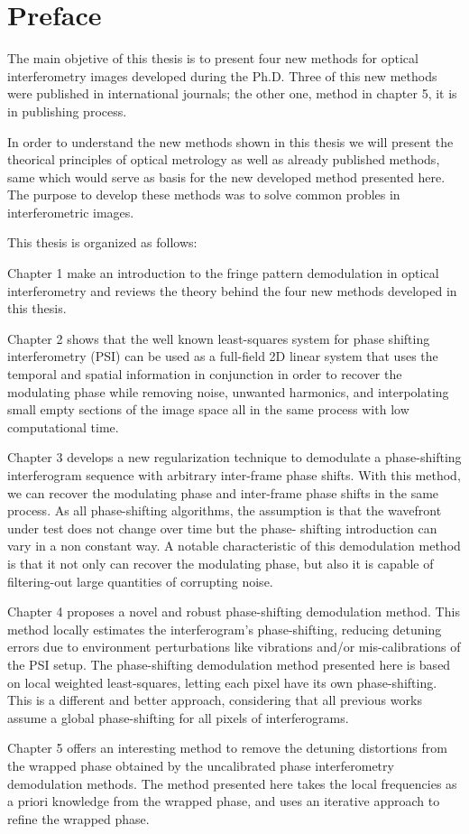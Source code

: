 \chapter*{Preface}

The main objetive of this thesis is to present four new methods for optical 
interferometry images developed during the Ph.D. Three of this new methods were 
published in international journals; the other one, method in chapter 5, it is in
publishing process.

In order to understand the new methods shown in this thesis we will present the
theorical principles of optical metrology as well as already published methods, 
same which would serve as basis for the new developed method presented here. 
The purpose to develop these methods was to solve common probles in interferometric
images. 

This thesis is organized as follows:

Chapter 1 make an introduction to the fringe pattern demodulation in optical 
interferometry and reviews the theory behind the four new methods developed in 
this thesis.

Chapter 2 shows that the well known least-squares system for phase shifting 
interferometry (PSI) can be used as a full-field 2D linear system that uses the 
temporal and spatial information in conjunction in order to recover the modulating 
phase while removing noise, unwanted harmonics, and interpolating small empty
sections of the image space all in the same process with low computational time.

Chapter 3 develops a new regularization technique to demodulate a 
phase-shifting interferogram sequence with arbitrary inter-frame phase shifts. 
With this method, we can recover the modulating phase and inter-frame phase
shifts in the same process. As all phase-shifting algorithms, the assumption
is that the wavefront under test does not change over time but the phase-
shifting introduction can vary in a non constant way. A notable characteristic
of this demodulation method is that it not only can recover the modulating
phase, but also it is capable of filtering-out large quantities of corrupting
noise.

Chapter 4 proposes a novel and robust phase-shifting demodulation method. 
This method locally estimates the interferogram's phase-shifting, reducing 
detuning errors due to environment perturbations like vibrations and/or 
mis-calibrations of the PSI setup. The phase-shifting demodulation method
presented here is based on local weighted least-squares, letting each pixel
have its own phase-shifting. This is a different and better approach, considering 
that all previous works assume a global phase-shifting for all pixels
of interferograms.

Chapter 5 offers an interesting method to remove the detuning distortions from 
the wrapped phase obtained by the uncalibrated phase interferometry demodulation 
methods. The method presented here takes the local frequencies as a priori 
knowledge from the wrapped phase, and uses an iterative approach to refine the 
wrapped phase.
